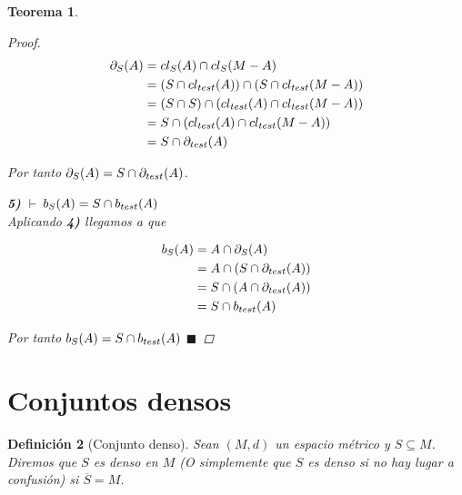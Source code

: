 \documentclass[oneside]{book} %
\theoremstyle{Teorema}
\newtheorem{Definicion}{Definición}[chapter]
\newtheorem{Teorema}[Definicion]{Teorema}
\theoremstyle{Ejemplos}
\theoremstyle{[Obs]}
\def \test {test}
\newcommand{\cerradura}[2][\test]{\ifx \test #1 {\overline{#2}} \else {cl_{#1}(#2)} \fi} %
\newcommand{\frontera}[2][\test]{\ifx \test #1 {\partial(#2)} \else {\partial_{#1}(#2)} \fi} %
\newcommand{\borde}[2][\test]{\ifx \test #1 {b(#2)} \else {b_{#1}(#2)} \fi} %
\renewcommand{\{}{\left\lbrace} %
\renewcommand{\}}{\right\rbrace} %
\newcommand{\n}{\cap} %
\renewcommand{\sc}{\subseteq} %
\renewcommand{\qed}{$\blacksquare$} %
\newcommand{\pd}{$\vdash\ $} %
\begin{document}
\begin{Teorema}
\begin{proof}
					\begin{align*}
						\frontera[S]{A} &= \cerradura[S]{A} \n \cerradura[S]{M - A} \\ 
						&= (S \n \cerradura{A}) \n (S \n \cerradura{M - A}) \\ 
						&= (S \n S) \n (\cerradura{A} \n \cerradura{M - A}) \\ 
						&= S \n (\cerradura{A} \n \cerradura{M - A}) \\ 
						&= S \n \frontera{A} 
					\end{align*}

					Por tanto $\frontera[S]{A} = S \n \frontera{A}$.

					\textbf{5)} \pd $\borde[S]{A} = S \n \borde{A}$ \\ 
					Aplicando \textbf{4)} llegamos a que 

					\begin{align*}
						\borde[S]{A} & = A \n \frontera[S]{A} \\ 
						&= A \n (S \n \frontera{A}) \\ 
						&= S \n (A \n \frontera{A}) \\ 
						&= S \n \borde{A}
					\end{align*}

					Por tanto $\borde[S]{A} = S \n \borde{A}$ \qed

				\end{proof}

			\end{Teorema}

		\section{Conjuntos densos}

			\begin{Definicion}[Conjunto denso]\setlength{\parindent}{0em}
				
				Sean $(M, d)$ un espacio métrico y $S \sc M$. Diremos que $S$ es denso en $M$ (O simplemente que $S$ es denso si no hay lugar a confusión) si $\overline{S} = M$. 

			\end{Definicion}
\end{document}
